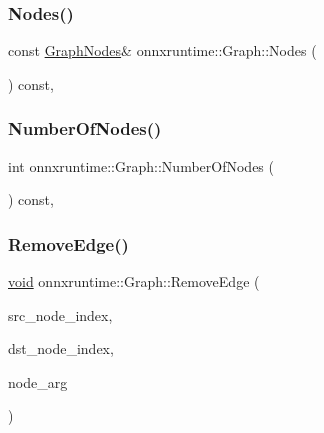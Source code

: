 \mbox{\label{classonnxruntime_1_1Graph_a6ebaafa47a4b7516769b9ea5f57e3792}} 
\subsubsection{\texorpdfstring{Nodes()}{Nodes()}\hspace{0.1cm}{\footnotesize\ttfamily [2/2]}}
{\footnotesize\ttfamily const \mbox{\hyperlink{classonnxruntime_1_1GraphNodes}{Graph\+Nodes}}\& onnxruntime\+::\+Graph\+::\+Nodes (\begin{DoxyParamCaption}{ }\end{DoxyParamCaption}) const\hspace{0.3cm}{\ttfamily [inline]}, {\ttfamily [noexcept]}}

\mbox{\label{classonnxruntime_1_1Graph_addf43a7353a5eb2713f2f25d067e548f}} 
\subsubsection{\texorpdfstring{Number\+Of\+Nodes()}{NumberOfNodes()}}
{\footnotesize\ttfamily int onnxruntime\+::\+Graph\+::\+Number\+Of\+Nodes (\begin{DoxyParamCaption}{ }\end{DoxyParamCaption}) const\hspace{0.3cm}{\ttfamily [inline]}, {\ttfamily [noexcept]}}

\mbox{\label{classonnxruntime_1_1Graph_adabb88e56d16bc912e5fb8ffe54f6d6b}} 
\subsubsection{\texorpdfstring{Remove\+Edge()}{RemoveEdge()}}
{\footnotesize\ttfamily \mbox{\hyperlink{mlasi_8h_a88f941d423cb2a819b70a1358982b1a6}{void}} onnxruntime\+::\+Graph\+::\+Remove\+Edge (\begin{DoxyParamCaption}\item[{\mbox{\hyperlink{namespaceonnxruntime_af8773b5c12b5d8fd9292eb2e268df760}{Node\+Index}}}]{src\+\_\+node\+\_\+index,  }\item[{\mbox{\hyperlink{namespaceonnxruntime_af8773b5c12b5d8fd9292eb2e268df760}{Node\+Index}}}]{dst\+\_\+node\+\_\+index,  }\item[{const \mbox{\hyperlink{classonnxruntime_1_1NodeArg}{Node\+Arg}} \&}]{node\+\_\+arg }\end{DoxyParamCaption})}

